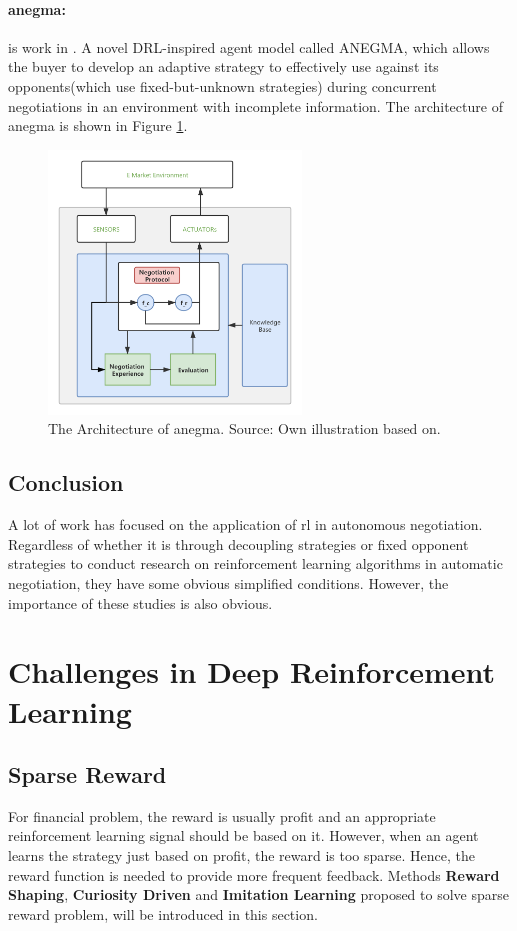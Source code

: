 \paragraph{\gls{anegma}:} is work in \parencite{bagga2020deep}. A novel DRL-inspired agent model called ANEGMA, which allows the buyer to develop an adaptive strategy to effectively use against its opponents(which use fixed-but-unknown strategies) during concurrent negotiations in an environment with incomplete information. The architecture of \gls{anegma} is shown in Figure \ref{fig:anegma}.
\begin{figure}[htbp]
\centering
\includegraphics[width=0.6\textwidth]{./images/anegma.png}
\caption{The Architecture of \gls{anegma}. Source: Own illustration based on\parencite{bagga2020deep}.}
\label{fig:anegma}
\end{figure}

\subsection{Conclusion}
A lot of work has focused on the application of \gls{rl} in autonomous negotiation. Regardless of whether it is through decoupling strategies or fixed opponent strategies to conduct research on reinforcement learning algorithms in automatic negotiation, they have some obvious simplified conditions. However, the importance of these studies is also obvious.

\section{Challenges in Deep Reinforcement Learning}

\subsection{Sparse Reward} \label{related-work:sparse-reward}
For financial problem, the reward is usually profit and an appropriate reinforcement learning signal should be based on it. However, when an agent learns the strategy just based on profit, the reward is too sparse. Hence, the reward function is needed to provide more frequent feedback. Methods \textbf{Reward Shaping},\textbf{ Curiosity Driven} and \textbf{Imitation Learning} proposed to solve sparse reward problem, will be introduced in this section.

